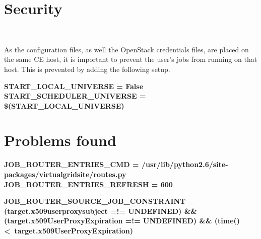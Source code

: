 \documentclass[a4paper]{jpconf}
\begin{document}
\section{Security}

~

As the configuration files, as well the OpenStack credentials files, 
are placed on the same CE host, it is important to prevent the user's jobs from running on that host.
This is prevented by adding the following setup.

\begin{center}
    \colorbox{htcondorbox}{
        \begin{minipage}{\textwidth}
        \small
            \bf{START\_LOCAL\_UNIVERSE = False \newline
                START\_SCHEDULER\_UNIVERSE = \$(START\_LOCAL\_UNIVERSE)
            }
        \end{minipage}
    }
\end{center}


\section{Problems found}


\begin{center}
    \colorbox{htcondorbox}{
        \begin{minipage}{\textwidth}
        \small
            \bf{JOB\_ROUTER\_ENTRIES\_CMD = \newline 
                \hspace*{1cm}/usr/lib/python2.6/site-packages/virtualgridsite/routes.py \newline
                JOB\_ROUTER\_ENTRIES\_REFRESH = 600
            }
        \end{minipage}
    }
\end{center}

\begin{center}
    \colorbox{htcondorbox}{
        \begin{minipage}{\textwidth}
        \small
            \bf{JOB\_ROUTER\_SOURCE\_JOB\_CONSTRAINT = \newline
               (target.x509userproxysubject =!= UNDEFINED) \&\& \newline
               (target.x509UserProxyExpiration =!= UNDEFINED) \&\& \newline
               (time() \textless \  target.x509UserProxyExpiration)
            }
        \end{minipage}
    }
\end{center}
\end{document}
